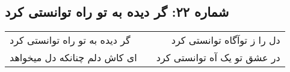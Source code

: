 \begin{center}
\section*{شماره ۲۲: گر دیده به تو راه توانستی کرد}
\label{sec:022}
\begin{longtable}{l p{0.5cm} r}
گر دیده به تو راه توانستی کرد
&&
دل را ز توآگاه توانستی کرد
\\
ای کاش دلم چنانکه دل میخواهد
&&
در عشق تو یک آه توانستی کرد
\\
\end{longtable}
\end{center}
